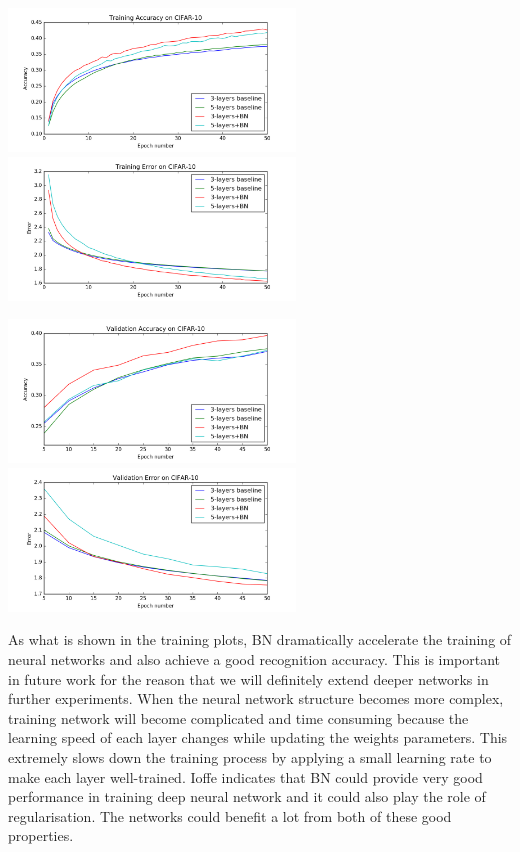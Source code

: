 \documentclass[]{article}
\begin{document}
\includegraphics[width=3in]{BN_train_acc}
\includegraphics[width=3in]{BN_train_err}

\includegraphics[width=3in]{BN_valid_acc}
\includegraphics[width=3in]{BN_valid_err}

As what is shown in the training plots, BN dramatically accelerate the training of neural networks and also achieve a good recognition accuracy. This is important in future work for the reason that we will definitely extend deeper networks in further experiments. When the neural network structure becomes more complex, training network will become complicated and time consuming because the learning speed of each layer changes while updating the weights parameters. This extremely slows down the training process by applying a small learning rate to make each layer well-trained. Ioffe indicates that BN could provide very good performance in training deep neural network and it could also play the role of regularisation. The networks could benefit a lot from both of these good properties.
\end{document}
